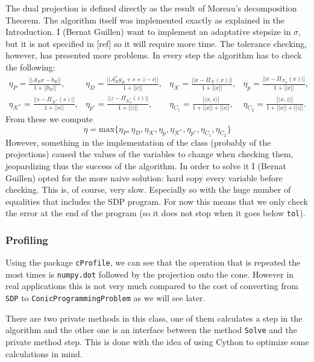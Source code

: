 \documentclass[paper=a4, fontsize=11pt]{scrartcl}
\numberwithin{equation}{section}		%
\numberwithin{figure}{section}			%
\numberwithin{table}{section}				%
\begin{document}
The dual projection is defined directly as the result of Moreau's decomposition Theorem.
The algorithm itself was implemented exactly as explained in the Introduction. I (Bernat Guillen) want to implement an adaptative stepsize in $\sigma$, but it is not specified in [ref] so it will require more time. The tolerance checking, however, has presented more problems. In every step the algorithm has to check the following:
\begin{align*}
\eta_P = \frac{||\mathcal{A}_Ex-b_E||}{1+||b_E||},&\eta_D=\frac{||\mathcal{A}_E^*y_E+s+z-c||}{1+||c||},&\eta_\mathcal{K}=\frac{||x-\Pi_{\mathcal{K}}(x)||}{1+||x||},&\eta_p = \frac{||x-\Pi_{\mathcal{K}_p}(x)||}{1+||x||},&\\
\eta_{\mathcal{K}^*} = \frac{||s-\Pi_{\mathcal{K^*}}(s)||}{1+||s||},&\eta_{p^*} = \frac{||z - \Pi_{\mathcal{K}_p^*}(z)||}{1+||z||},&\eta_{C_1} = \frac{|\langle x,s \rangle|}{1+||x|| +||s||},&\eta_{C_2} = \frac{|\langle x,z \rangle |}{1+||x|| +||z||}.&
\end{align*}
From these we compute $$\eta = \text{max}\{\eta_P,\eta_D,\eta_{\mathcal{K}},\eta_p,\eta_{\mathcal{K}^*}, \eta_{p^*}, \eta_{C_1},\eta_{C_2}\}$$
However, something in the implementation of the class (probably of the projections) caused the values of the variables to change when checking them, jeopardizing thus the success of the algorithm. In order to solve it I (Bernat Guillen) opted for the more naive solution: hard copy every variable before checking. This is, of course, very slow. Especially so with the huge number of equalities that includes the SDP program. For now this means that we only check the error at the end of the program (so it does not stop when it goes below \texttt{tol}). 
\subsubsection{Profiling}
Using the package \texttt{cProfile}, we can see that the operation that is repeated the most times is \texttt{numpy.dot} followed by the projection onto the cone. However in real applications this is not very much compared to the cost of converting from \texttt{SDP} to \texttt{ConicProgrammingProblem} as we will see later.

There are two private methods in this class, one of them calculates a step in the algorithm and the other one is an interface between the method \texttt{Solve} and the private method step. This is done with the idea of using Cython to optimize some calculations in mind.
\end{document}
